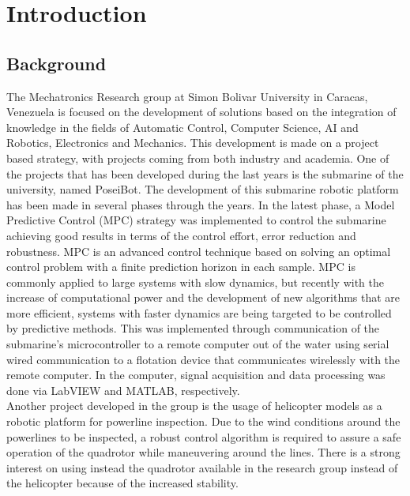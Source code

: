 \chapter{Introduction}
\label{chap:Introduction}
%
%
%
%

\section{Background}

The Mechatronics Research group at Simon Bolivar University in Caracas, Venezuela is focused on the development of solutions based on the integration of knowledge in the fields of Automatic Control, Computer Science, AI and Robotics, Electronics and Mechanics. This development is made on a project based strategy, with projects coming from both industry and academia. One of the projects that has been developed during the last years is the submarine of the university, named PoseiBot. The development of this submarine robotic platform has been made in several phases through the years. In the latest phase, a Model Predictive Control (MPC) strategy was implemented to control the submarine achieving good results in terms of the control effort, error reduction and robustness. MPC is an advanced control technique based on solving an optimal control problem with a finite prediction horizon in each sample. MPC is commonly applied to large systems with slow dynamics, but recently with the increase of computational power and the development of new algorithms that are more efficient, systems with faster dynamics are being targeted to be controlled by predictive methods. This was implemented through communication of the submarine's microcontroller to a remote computer out of the water using serial wired communication to a flotation device that communicates wirelessly with the remote computer. In the computer, signal acquisition  and data processing was done via LabVIEW \texttrademark  and MATLAB\textsuperscript{\textregistered}, respectively. \\

Another project developed in the group is the usage of helicopter models as a robotic platform for powerline inspection. Due to the wind conditions around the powerlines to be inspected, a robust control algorithm is required to assure a safe operation of the quadrotor while maneuvering around the lines. There is a strong interest on using instead the quadrotor available in the research group instead of the helicopter because of the increased stability. \\

